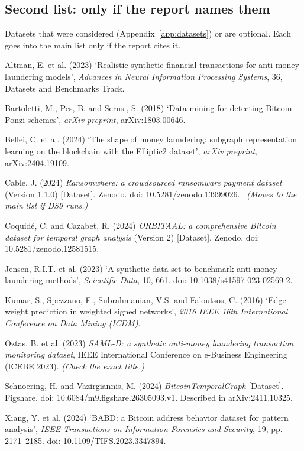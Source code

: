 \subsection*{Second list: only if the report names them}

Datasets that were considered (Appendix~\ref{app:datasets}) or are optional. Each goes into the
main list only if the report cites it.

\begin{references}
\item Altman, E. et al. (2023) ‘Realistic synthetic financial transactions for anti-money laundering models’, \textit{Advances in Neural Information Processing Systems}, 36, Datasets and Benchmarks Track.

\item Bartoletti, M., Pes, B. and Serusi, S. (2018) ‘Data mining for detecting Bitcoin Ponzi schemes’, \textit{arXiv preprint}, arXiv:1803.00646. \textdagger

\item Bellei, C. et al. (2024) ‘The shape of money laundering: subgraph representation learning on the blockchain with the Elliptic2 dataset’, \textit{arXiv preprint}, arXiv:2404.19109. \textdagger

\item Cable, J. (2024) \textit{Ransomwhere: a crowdsourced ransomware payment dataset} (Version 1.1.0) [Dataset]. Zenodo. doi: 10.5281/zenodo.13999026. \textdagger\ \emph{(Moves to the main list if DS9 runs.)}

\item Coquidé, C. and Cazabet, R. (2024) \textit{ORBITAAL: a comprehensive Bitcoin dataset for temporal graph analysis} (Version 2) [Dataset]. Zenodo. doi: 10.5281/zenodo.12581515. \textdagger

\item Jensen, R.I.T. et al. (2023) ‘A synthetic data set to benchmark anti-money laundering methods’, \textit{Scientific Data}, 10, 661. doi: 10.1038/s41597-023-02569-2. \textdagger

\item Kumar, S., Spezzano, F., Subrahmanian, V.S. and Faloutsos, C. (2016) ‘Edge weight prediction in weighted signed networks’, \textit{2016 IEEE 16th International Conference on Data Mining (ICDM)}. \textdagger

\item Oztas, B. et al. (2023) \textit{SAML-D: a synthetic anti-money laundering transaction monitoring dataset}, IEEE International Conference on e-Business Engineering (ICEBE 2023). \emph{(Check the exact title.)}

\item Schnoering, H. and Vazirgiannis, M. (2024) \textit{BitcoinTemporalGraph} [Dataset]. Figshare. doi: 10.6084/m9.figshare.26305093.v1. Described in arXiv:2411.10325. \textdagger

\item Xiang, Y. et al. (2024) ‘BABD: a Bitcoin address behavior dataset for pattern analysis’, \textit{IEEE Transactions on Information Forensics and Security}, 19, pp. 2171–2185. doi: 10.1109/TIFS.2023.3347894. \textdagger
\end{references}
